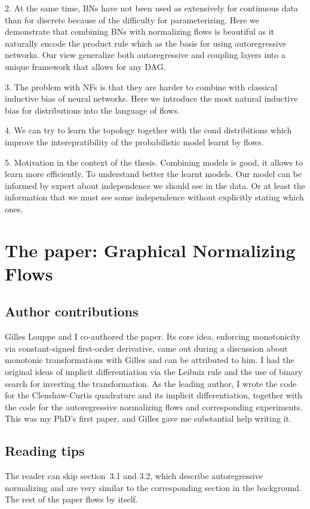 2. At the same time, BNs have not been used as extensively for continuous data than for discrete because of the difficulty for parameterizing. Here we demonstrate that combining BNs with normalizing flows is beautiful as it naturally encode the product rule which as the basis for using autoregressive networks. Our view generalize both autoregressive and coupling layers into a unique framework that allows for any DAG.

3. The problem with NFs is that they are harder to combine with classical inductive bias of neural networks. Here we introduce the most natural inductive bias for distributions into the language of flows.

4. We can try to learn the topology together with the cond distribitions which improve the interepratibility of the probabilistic model learnt by flows.

5. Motivation in the context of the thesis. Combining models is good, it allows to learn more efficiently. To understand better the learnt models. Our model can be informed by expert about independence we should see in the data. Or at least the information that we must see some independence without explicitly stating which ones.


\section{The paper: Graphical Normalizing Flows}
\subsection{Author contributions}
Gilles Louppe and I co-authored the paper. Its core idea, enforcing monotonicity via constant-signed first-order derivative, came out during a discussion about monotonic transformations with Gilles and can be attributed to him. I had the original ideas of implicit differentiation via the Leibniz rule and the use of binary search for inverting the transformation. As the leading author, I wrote the code for the Clenshaw-Curtis quadrature and its implicit differentiation, together with the code for the autoregressive normalizing flows and corresponding experiments. This was my PhD's first paper, and Gilles gave me substantial help writing it.

\subsection{Reading tips}
The reader can skip section~3.1 and 3.2, which describe autoregressive normalizing and are very similar to the corresponding section in the background. The rest of the paper flows by itself.

